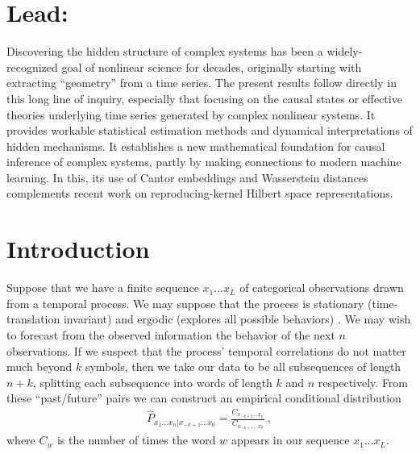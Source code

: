 \documentclass[draft,aps,pre,twocolumn,groupaddress,showkeys,nofootinbib,preprintnumbers,floatfix]{revtex4-2}
\begin{document}

\date{\today}
\maketitle

\makeatletter
\let\toc@pre\relax
\let\toc@post\relax
\makeatother


\listoffixmes

{\bf
\section*{Lead:}
Discovering the hidden structure of complex systems has been a widely-recognized
goal of nonlinear science for decades, originally starting with extracting
``geometry'' from a time series. The present results follow directly in this
long line of inquiry, especially that focusing on the causal states or
effective theories underlying time series generated by complex nonlinear
systems. It provides workable statistical estimation methods and dynamical
interpretations of hidden mechanisms. It establishes a new mathematical
foundation for causal inference of complex systems, partly by making
connections to modern machine learning. In this, its use of Cantor embeddings and Wasserstein distances complements recent work on reproducing-kernel Hilbert space representations.
}

\section{Introduction}
Suppose that we have a finite sequence $x_1 \dots x_L$ of categorical
observations drawn from a temporal process. We may suppose that the process is
stationary (time-translation invariant) and ergodic (explores
all possible behaviors) \cite{Fell70a,Kall01a}. We may wish to forecast from the
observed information the behavior of the next $n$ observations. If we suspect
that the process' temporal correlations do not matter much beyond $k$ symbols,
then we take our data to be all subsequences of length $n+k$,
splitting each subsequence into words of length $k$ and $n$ respectively. From
these ``past/future'' pairs we can construct an empirical conditional
distribution
\begin{align*}
  \widehat{P}_{x_{1}\dots x_{n}|x_{-k+1}\dots x_0} = 
  \frac{C_{x_{-k+1}\dots x_{n}}}{C_{x_{-k+1}\dots x_0}}
  ~,
\end{align*}
where $C_{w}$ is the number of times the word $w$ appears in our sequence $x_1
\dots x_L$. 
\end{document}
